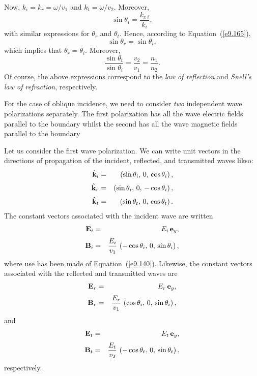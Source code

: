 Now, $k_i=k_r = \omega/v_1$ and $k_t=\omega/v_2$. Moreover,
\begin{equation}
\sin\theta_i = \frac{k_{x\,i}}{k_i},
\end{equation}
with similar expressions for $\theta_r$ and $\theta_t$. Hence, according
to Equation~(\ref{e9.165}), 
\begin{equation}
\sin\theta_r = \sin\theta_i,
\end{equation}
which implies that $\theta_r=\theta_i$. Moreover,
\begin{equation}\label{e9.169}
\frac{\sin\theta_t}{\sin\theta_i} = \frac{v_2}{v_1} = \frac{n_1}{n_2}.
\end{equation}
Of course, the above expressions correspond to the {\em law of reflection}
and {\em Snell's law of refraction}, respectively.

For the case of oblique incidence, we need to consider {\em two} independent
wave polarizations  separately. The first polarization
has all the wave electric fields  parallel to the boundary whilst
the second has all  the wave magnetic fields parallel to the boundary 

Let us consider the first wave polarization. We can write unit vectors
in the directions of propagation of the incident, reflected, and transmitted
waves likso:
\begin{eqnarray}
\hat{\bf k}_i &=&\left(\sin\theta_i,\,0,\,\cos\theta_i\right),\\[0.5ex]
\hat{\bf k}_r &=& \left(\sin\theta_i,\,0,\,-\cos\theta_i\right),\\[0.5ex]
\hat{\bf k}_t &=&\left(\sin\theta_t,\,0,\,\cos\theta_t\right).\label{e9.172x}
\end{eqnarray}
The constant vectors associated with the incident wave are written
\begin{eqnarray}
{\bf E}_i &=& E_i\,{\bf e}_y,\\[0.5ex]
{\bf B}_i &=& \frac{E_i}{v_1}\,\left(-\cos\theta_i,\,0,\,\sin\theta_i\right),
\end{eqnarray}
where use has been made of Equation~(\ref{e9.140}). Likewise, the constant
vectors associated with the reflected and transmitted waves are
\begin{eqnarray}
{\bf E}_r &=& E_r\,{\bf e}_y,\\[0.5ex]
{\bf B}_r &=& \frac{E_r}{v_1}\,\left(\cos\theta_i,\,0,\,\sin\theta_i\right),
\end{eqnarray}
and
\begin{eqnarray}
{\bf E}_t &=& E_t\,{\bf e}_y,\\[0.5ex]
{\bf B}_t &=& \frac{E_t}{v_2}\,\left(-\cos\theta_t,\,0,\,\sin\theta_t\right),
\end{eqnarray}
respectively.

